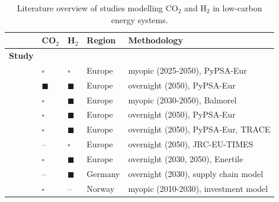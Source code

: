 \documentclass[pdflatex,sn-nature]{sn-jnl}
\theoremstyle{thmstyleone}%
\theoremstyle{thmstyletwo}%
\theoremstyle{thmstylethree}%
\begin{document}
\begin{table}[htbp]
  \centering
  \caption{Literature overview of studies modelling CO$_2$ and H$_2$ in low-carbon energy systems.}
  \label{tab:literature}
  \scriptsize
  \begin{tabularx}{\linewidth}{R{1.3cm}>{\hsize\centering\arraybackslash}X>{\hsize\centering\arraybackslash}X>{\hsize\centering\arraybackslash}X>{\hsize\centering\arraybackslash}X}
    \toprule
    & \textbf{CO$_2$} & \textbf{H$_2$} & \textbf{Region} & \textbf{Methodology} \\
    \midrule
    \textbf{Study} & & & & \\
    \cite{vangreevenbroekLittleLoseCase2025} & $\square$ & $\square$ & Europe & myopic (2025-2050), PyPSA-Eur\\
    \cite{hofmannH2CO2Network2025} & $\blacksquare$ & $\blacksquare$ & Europe & overnight (2050), PyPSA-Eur\\
    \cite{kountourisUnifiedEuropeanHydrogen2024} & $\square$  & $\blacksquare$ & Europe & myopic (2030-2050), Balmorel \cite{wieseBalmorelOpenSource2018} \\
    \cite{neumannPotentialRoleHydrogen2023} & $\square$ & $\blacksquare$ & Europe & overnight (2050), PyPSA-Eur \\
    \cite{neumannGreenEnergySteel2025} & $\square$ & $\blacksquare$ & Europe & overnight (2050), PyPSA-Eur, TRACE \cite{hamppImportOptionsChemical2023} \\
    \cite{beresWillHydrogenSynthetic2024} & -- & $\square$ & Europe & overnight (2050), JRC-EU-TIMES \\
    \cite{fleiterHydrogenInfrastructureFuture2025} & $\square$ & $\blacksquare$ & Europe & overnight (2030, 2050), Enertile \\
    \cite{cerniauskasOptionsNaturalGas2020} & -- & $\blacksquare$ & Germany & overnight (2030), supply chain model \cite{reussSeasonalStorageAlternative2017} \\
    \cite{bakkenLinearModelsOptimization2008} & $\square$ & -- & Norway & myopic (2010-2030), investment model \\
    \bottomrule
  \end{tabularx}
  \centering
\end{table}
\end{document}
